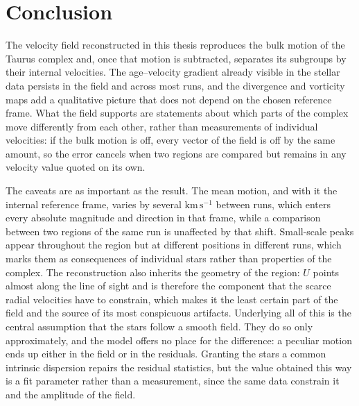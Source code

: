 \chapter{Conclusion}
\label{sec:Conclusion}

The velocity field reconstructed in this thesis reproduces the bulk motion of the Taurus complex
and, once that motion is subtracted, separates its subgroups by their internal velocities. The
age--velocity gradient already visible in the stellar data persists in the field and across most
runs, and the divergence and vorticity maps add a qualitative picture that does not depend on the
chosen reference frame. What the field supports are statements about which parts of the complex move differently from each
other, rather than measurements of individual velocities: if the bulk motion is off, every
vector of the field is off by the same amount, so the error cancels when two regions are compared
but remains in any velocity value quoted on its own.

The caveats are as important as the result. The mean motion, and with it the internal reference
frame, varies by several $\mathrm{km\,s^{-1}}$ between runs, which enters every absolute magnitude and
direction in that frame, while a comparison between two regions of the same run is unaffected by
that shift. Small-scale peaks appear
throughout the region but at different positions in different runs, which marks them as
consequences of individual stars rather than properties of the complex. The reconstruction also
inherits the geometry of the region: $U$ points almost along the line of sight and is therefore the
component that the scarce radial velocities have to constrain, which makes it the least certain
part of the field and the source of its most conspicuous artifacts. Underlying all of this is the
central assumption that the stars follow a smooth field. They do so only approximately, and the model
offers no place for the difference: a peculiar motion ends up either in the field or in the
residuals. Granting the stars a common intrinsic dispersion repairs the
residual statistics, but the value obtained this way is a fit parameter rather than a measurement,
since the same data constrain it and the amplitude of the field.

